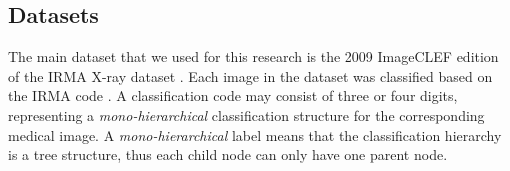 \documentclass[wcp]{jmlr}
\begin{document}
\subsection{Datasets}\label{sec:datasets}

The main dataset that we used for this research is the 2009 ImageCLEF edition of the IRMA X-ray dataset \cite{clef}. 
Each image in the dataset was classified based on the IRMA code \cite{Lehmann01}. %
A classification code may consist of three or four digits, representing a \textit{mono-hierarchical} classification structure for the corresponding medical image. %
A \textit{mono-hierarchical} label means that the classification hierarchy is a tree structure, thus each child node can only have one parent node.  

   
\end{document}
